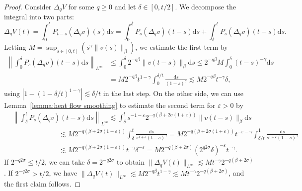 \documentclass[11pt,a4paper]{article}
\newcommand{\mathd}{\mathrm{d}}
\theoremstyle{remark}
\begin{document}
\begin{proof}
  Consider $\Delta_{q} V$ for some $q \geqslant 0$ and let $\delta \in [ 0,t/2 ]$. We decompose the integral into two parts:
  \[
     \Delta_{q} V ( t ) = \int_{0}^{t} P_{t-s} ( \Delta_{q} v ) ( s ) \mathd s= \int_{0}^{\delta} P_{s} ( \Delta_{q} v ) ( t-s ) \mathd s+  \int_{\delta}^{t} P_{s} ( \Delta_{q} v ) ( t-s ) \mathd s.
  \]
  Letting $M= \sup_{s \in [ 0,t ]} ( s^{\gamma} \| v ( s ) \|_{\beta} )$, we estimate the first term by
  \begin{align*}
     \left\| \int_{0}^{\delta} P_{s} ( \Delta_{q} v ) ( t-s ) \mathd s \right\|_{L^{\infty}} & \leqslant \int_{0}^{\delta} 2^{-q \beta} \| v ( t-s ) \|_{\beta} \mathd s \leqslant 2^{-q \beta} M \int_{0}^{\delta} ( t-s)^{- \gamma} \mathd s \\
     & =M2^{-q \beta} t^{1- \gamma} \int_{0}^{\delta /t} \frac{\mathd s}{( 1-s )^{\gamma}} \lesssim M2^{-q \beta} t^{- \gamma} \delta ,
  \end{align*}
  using $| 1- ( 1- \delta /t )^{1- \gamma} | \lesssim \delta /t$ in the last step. On the other side, we can use Lemma~\ref{lemma:heat flow smoothing} to
  estimate the second term for $\varepsilon >0$ by
  \begin{align*}
     &\left\| \int_{\delta}^{t} P_{s} ( \Delta_{q} v ) ( t-s ) \mathd s \right\|_{L^{\infty}} \lesssim \int_{\delta}^{t} s^{-1- \varepsilon} 2^{-q ( \beta +2 \sigma ( 1+ \varepsilon ) )} \| v ( t-s ) \|_{\beta} \mathd s \\
     &\hspace{80pt} \lesssim M2^{-q ( \beta +2 \sigma ( 1+ \varepsilon ) )} \int_{\delta}^{t} \frac{\mathd s}{s^{1+ \varepsilon} ( t-s )^{\gamma}} =M2^{-q ( \beta +2 \sigma ( 1+ \varepsilon ) )} t^{- \varepsilon - \gamma} \int_{\delta /t}^{1} \frac{\mathd s}{s^{1+ \varepsilon} ( 1-s )^{\gamma}} \\
     &\hspace{80pt} \lesssim M2^{-q ( \beta +2 \sigma ( 1+ \varepsilon ) )} t^{- \gamma} \delta^{- \varepsilon} =M2^{-q ( \beta +2 \sigma )} ( 2^{q2 \sigma} \delta  )^{- \varepsilon} t^{- \gamma} .
  \end{align*}
  If $2^{-q2 \sigma} \leqslant t/2$, we can take $\delta =2^{-q2 \sigma}$ to
  obtain $\| \Delta_{q} V ( t ) \|_{L^{\infty}} \lesssim Mt^{- \gamma} 2^{-q (\beta +2 \sigma )}$. If $2^{-q2 \sigma} >t/2$, we have $\| \Delta_{q} V ( t ) \|_{L^{\infty}} \lesssim M2^{-q \beta} t^{1- \gamma} \lesssim Mt^{- \gamma} 2^{-q ( \beta +2 \sigma )}$, and the first claim follows.
  

\end{proof}
\end{document}
